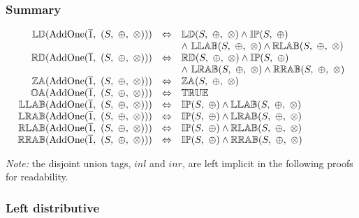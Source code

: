 \documentclass[10pt, ../Summary.tex]{subfiles}
\begin{document}
\subsubsection{Summary}

\[
\begin{array}{rcl} 
\propname{LD}(\mathrm{AddOne}(\overline{1},\ (S,\ \oplus,\ \otimes))) 
    & \Leftrightarrow %
    & \propname{LD}(S,\ \oplus,\ \otimes) 
      \wedge  \propname{IP}(S,\ \oplus) \\
	&&
      \wedge \ \propname{LLAB}(S,\ \oplus,\ \otimes) 
      \wedge \propname{RLAB}(S,\ \oplus,\ \otimes)
    \\
\propname{RD}(\mathrm{AddOne}(\overline{1},\ (S,\ \oplus,\ \otimes))) 
    & \Leftrightarrow %
    & \propname{RD}(S,\ \oplus,\ \otimes) 
      \wedge \propname{IP}(S,\ \oplus)  \\
	&&
      \wedge \ \propname{LRAB}(S,\ \oplus,\ \otimes) 
      \wedge \propname{RRAB}(S,\ \oplus,\ \otimes)
    \\
\propname{ZA}(\mathrm{AddOne}(\overline{1},\ (S,\ \oplus,\ \otimes))) 
    & \Leftrightarrow
    & \propname{ZA}(S,\ \oplus,\ \otimes) \\
\propname{OA}(\mathrm{AddOne}(\overline{1},\ (S,\ \oplus,\ \otimes))) 
    & \Leftrightarrow
    & \propname{TRUE}\\ 
\propname{LLAB}(\mathrm{AddOne}(\overline{1},\ (S,\ \oplus,\ \otimes))) 
    & \Leftrightarrow
    & \propname{IP}(S,\ \oplus) 
      \wedge \propname{LLAB}(S,\ \oplus,\ \otimes)
\\
\propname{LRAB}(\mathrm{AddOne}(\overline{1},\ (S,\ \oplus,\ \otimes))) 
    & \Leftrightarrow
    & \propname{IP}(S,\ \oplus) 
      \wedge \propname{LRAB}(S,\ \oplus,\ \otimes)
\\ 
\propname{RLAB}(\mathrm{AddOne}(\overline{1},\ (S,\ \oplus,\ \otimes))) 
    & \Leftrightarrow
    & \propname{IP}(S,\ \oplus) 
      \wedge \propname{RLAB}(S,\ \oplus,\ \otimes)
\\
\propname{RRAB}(\mathrm{AddOne}(\overline{1},\ (S,\ \oplus,\ \otimes))) 
    & \Leftrightarrow
    & \propname{IP}(S,\ \oplus) 
      \wedge \propname{RRAB}(S,\ \oplus,\ \otimes)
\\ 
\end{array} 
\] 

\emph{Note:} the disjoint union tags, $inl$ and $inr$, are left implicit in the following proofs for readability.

\subsubsection{Left distributive}
\end{document}
